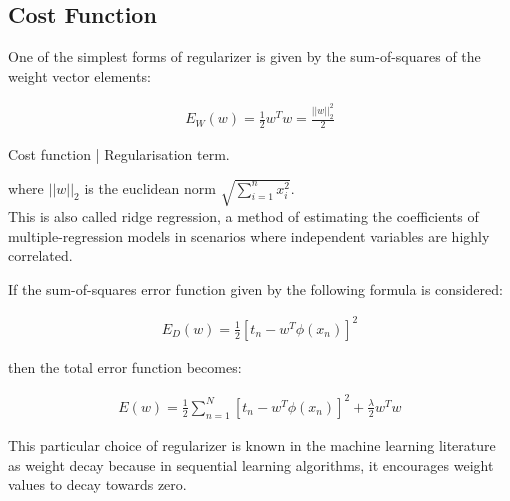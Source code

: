 \subsection{Cost Function}
\label{subsec:regcostfun}

One of the simplest forms of regularizer is given by the sum-of-squares of the weight vector elements:
\begin{Equation}[H]
	\centering
	\begin{equation}\label{eq:regularizer}
		\begin{aligned}
			E_W(w) = \frac{1}{2} w^T w = \frac{||w||^2_2}{2}
		\end{aligned}
	\end{equation}
	\caption[Cost function | Regularisation term.]{Cost function | Regularisation term.}
\end{Equation}

\noindent where $||w||_2$ is the euclidean norm $\sqrt{ \sum_{i=1}^{n} x^2_i}$. \\

\noindent This is also called ridge regression, a method of estimating the coefficients of multiple-regression models in scenarios where independent variables are highly correlated.

\noindent If the sum-of-squares error function given by the following formula is considered:
\begin{Equation}[H]
	\centering
		\begin{equation} \label{eq:sumsqinverted}
			\begin{aligned}
				E_D(w) = \frac{1}{2} [t_n - w^T \phi(x_n)]^2
			\end{aligned}
		\end{equation}
	
\end{Equation}

\noindent then the total error function becomes:
\begin{Equation}[H]
	\centering
		\begin{equation} \label{eq:lossridgereg}
			\begin{aligned}
				E(w) = \frac{1}{2} \sum_{n=1}^{N}[t_n - w^T \phi(x_n)]^2 + \frac{\lambda}{2} w^T w
			\end{aligned}
		\end{equation}
		\caption[Loss Function for Ridge Regression]{This particular choice of regularizer is known in the machine learning literature as weight decay because in sequential learning algorithms, it encourages weight values to decay towards zero.}
\end{Equation}

